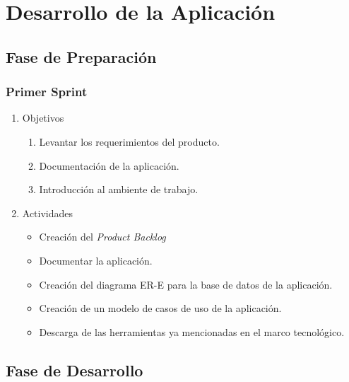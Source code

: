 \chapter{Desarrollo de la Aplicación}

\section{Fase de Preparación}
    \subsection{Primer Sprint}
    \begin{enumerate}
        \item Objetivos
        \begin{enumerate}
            \item Levantar los requerimientos del producto.
            \item Documentación de la aplicación.
            \item Introducción al ambiente de trabajo.
        \end{enumerate}
        \item Actividades
        \begin{itemize}
            \item Creación del \textit{Product Backlog}
            \item Documentar la aplicación.
            \item Creación del diagrama ER-E para la base de datos de la aplicación.
            \item Creación de un modelo de casos de uso de la aplicación.
            \item Descarga de las herramientas ya mencionadas en el marco tecnológico.
        \end{itemize}
    \end{enumerate}
        
\section{Fase de Desarrollo}
    

